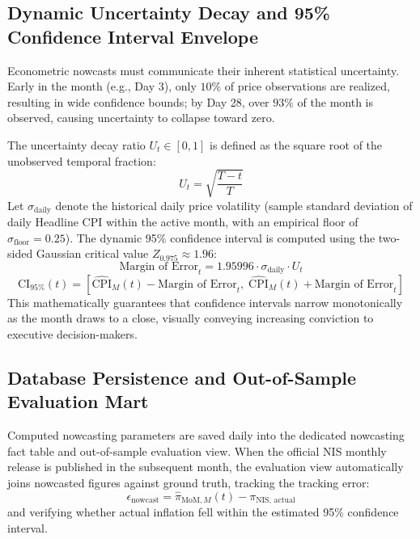 \subsection{Dynamic Uncertainty Decay and 95\% Confidence Interval Envelope}
\hs Econometric nowcasts must communicate their inherent statistical uncertainty. Early in the month (e.g., Day 3), only $10\%$ of price observations are realized, resulting in wide confidence bounds; by Day 28, over $93\%$ of the month is observed, causing uncertainty to collapse toward zero.

\hs The uncertainty decay ratio $U_t \in [0, 1]$ is defined as the square root of the unobserved temporal fraction:
\begin{equation}
    U_t = \sqrt{\frac{T - t}{T}}
\end{equation}
Let $\sigma_{\text{daily}}$ denote the historical daily price volatility (sample standard deviation of daily Headline CPI within the active month, with an empirical floor of $\sigma_{\text{floor}} = 0.25$). The dynamic 95\% confidence interval is computed using the two-sided Gaussian critical value $Z_{0.975} \approx 1.96$:
\begin{equation}
    \text{Margin of Error}_t = 1.95996 \cdot \sigma_{\text{daily}} \cdot U_t
\end{equation}
\begin{equation}
    \text{CI}_{95\%}(t) = \left[ \widehat{\text{CPI}}_M(t) - \text{Margin of Error}_t, \; \widehat{\text{CPI}}_M(t) + \text{Margin of Error}_t \right]
\end{equation}
This mathematically guarantees that confidence intervals narrow monotonically as the month draws to a close, visually conveying increasing conviction to executive decision-makers.

\subsection{Database Persistence and Out-of-Sample Evaluation Mart}
\hs Computed nowcasting parameters are saved daily into the dedicated nowcasting fact table and out-of-sample evaluation view. When the official NIS monthly release is published in the subsequent month, the evaluation view automatically joins nowcasted figures against ground truth, tracking the tracking error:
\begin{equation}
    \epsilon_{\text{nowcast}} = \widehat{\pi}_{\text{MoM}, M}(t) - \pi_{\text{NIS, actual}}
\end{equation}
and verifying whether actual inflation fell within the estimated 95\% confidence interval.

